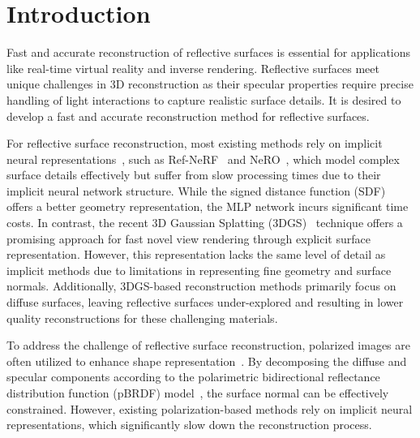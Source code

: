 \section{Introduction}

Fast and accurate reconstruction of reflective surfaces is essential for applications like real-time 
virtual reality and inverse rendering. Reflective surfaces meet unique challenges in 3D reconstruction 
as their specular properties require precise handling of light interactions to capture realistic surface 
details. It is desired to develop a fast and accurate reconstruction method for reflective surfaces.

For reflective surface reconstruction, most existing methods rely on implicit neural representations~\cite{mildenhall2020nerf}, 
such as Ref-NeRF~\cite{verbin2022ref} and NeRO~\cite{liu2023nero}, which model complex surface details effectively but suffer from slow 
processing times due to their implicit neural network structure. While the signed distance function (SDF) offers a better geometry representation, the MLP network incurs significant time costs. In contrast, the recent 3D Gaussian Splatting (3DGS)~\cite{kerbl20233d} 
technique offers a promising approach for fast novel view rendering through explicit surface 
representation. However, this representation lacks the same level of detail as implicit methods due to 
limitations in representing fine geometry and surface normals. Additionally, 3DGS-based reconstruction 
methods primarily focus on diffuse surfaces, leaving reflective surfaces under-explored and resulting in lower quality reconstructions for these challenging materials.


To address the challenge of reflective surface reconstruction, polarized images are often utilized to enhance shape representation~\cite{dave2022pandora,han2024nersp,cao2023multi,li2024neisf}. By decomposing the diffuse and specular components according to the polarimetric bidirectional reflectance distribution function (pBRDF) model~\cite{baek2018simultaneous}, the surface normal can be effectively constrained. However, existing polarization-based methods rely on implicit neural representations, which significantly slow down the reconstruction process.

